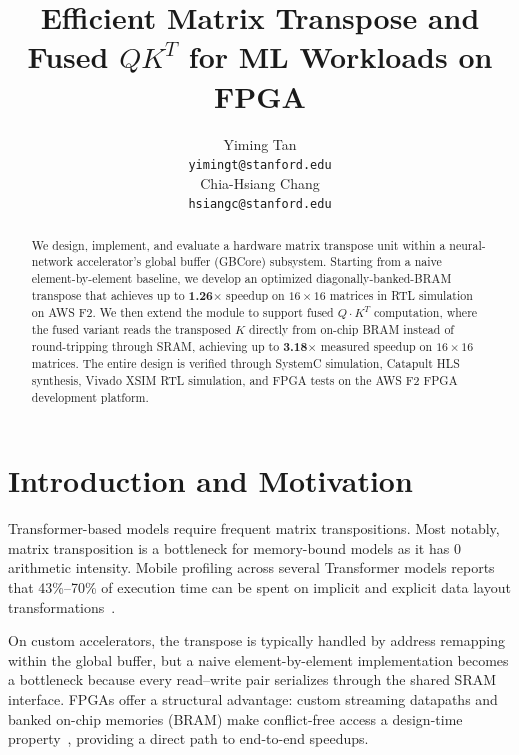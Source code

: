 \documentclass[11pt]{article}
\title{Efficient Matrix Transpose and Fused $QK^T$ for ML Workloads on FPGA}
\author{
  Yiming Tan\\
  \texttt{yimingt@stanford.edu} \\
  \And
  Chia-Hsiang Chang \\
  \texttt{hsiangc@stanford.edu} \\
}
\begin{document}
\maketitle

\begin{abstract}
We design, implement, and evaluate a hardware matrix transpose unit within a neural-network accelerator's global buffer (GBCore) subsystem. Starting from a naive element-by-element baseline, we develop an optimized diagonally-banked-BRAM transpose that achieves up to \textbf{1.26$\times$} speedup on $16\!\times\!16$ matrices in RTL simulation on AWS F2. We then extend the module to support fused $Q\!\cdot\!K^T$ computation, where the fused variant reads the transposed $K$ directly from on-chip BRAM instead of round-tripping through SRAM, achieving up to \textbf{3.18$\times$} measured
speedup on $16\!\times\!16$ matrices. The entire design is verified through SystemC simulation, Catapult HLS synthesis, Vivado XSIM RTL simulation, and FPGA tests on the AWS F2 FPGA development platform.
\end{abstract}

\section{Introduction and Motivation}

Transformer-based models require frequent matrix transpositions. Most notably, matrix transposition is a bottleneck for memory-bound models as it has 0 arithmetic intensity. Mobile
profiling across several Transformer models reports that 43\%--70\% of
execution time can be spent on implicit and explicit data layout
transformations~\cite{smartmem}. 

On custom accelerators, the transpose is typically handled by address remapping within the global buffer, but a naive element-by-element implementation becomes a bottleneck because every read--write pair serializes through the shared SRAM interface. FPGAs offer a structural advantage: custom streaming datapaths and banked on-chip memories (BRAM) make conflict-free access a design-time property~\cite{fpga_xpose}, providing a direct path to end-to-end speedups.
\end{document}
